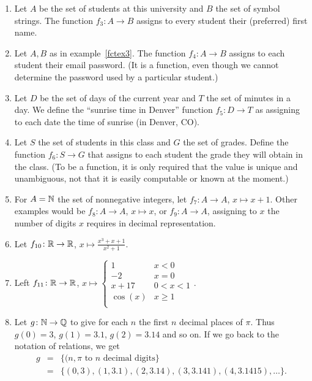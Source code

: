 \begin{enumerate}
\item Let $A$ be the set of students at this university and $B$ the set of
symbol strings. The function $f_3\colon A\to B$ assigns to every student their
(preferred) first name. \label{fctex3}
\item Let $A,B$ as in example~\ref{fctex3}.
The function $f_4\colon A\to B$ assigns to each student
their email password. (It is a function, even though we cannot determine the
password used by a particular student.)
\item Let $D$ be the set of days of the current year and $T$ the set of
minutes in a day. We define the ``sunrise time in Denver'' function $f_5\colon
D\to T$ as assigning to each date the time of sunrise (in Denver, CO).
\item Let $S$ the set of students in this class and $G$ the set of grades.
Define the function $f_6\colon S\to G$ that assigns to each student the
grade they will obtain in the class.
(To be a function, it is only required that the value is unique and
unambiguous, not that it is easily computable or known at the moment.)
\item For $A={\mathbb N}$ the set of nonnegative integers,
let $f_7\colon A\to A$, $x\mapsto x+1$. Other examples would be
$f_8\colon A\to A$, $x\mapsto x$, or
$f_9\colon A\to A$, assigning to $x$ the number of digits $x$ requires in
decimal representation.
\item Let $f_{10}\colon {\mathbb R}\to{\mathbb R}$, $x\mapsto\frac{x^3+x+1}{x^2+1}$.
\item Left $f_{11}\colon{\mathbb R}\to{\mathbb R}$, $x\mapsto\begin{cases}
1&x<0\\
-2&x=0\\
x+17&0<x<1\\
\cos(x)&x\ge 1\\
\end{cases}$.
\item Let $g\colon{\mathbb N}\to{\mathbb Q}$ to give for each $n$ the first $n$ decimal
places of $\pi$. Thus $g(0)=3$, $g(1)=3.1$, $g(2)=3.14$ and so on. If we go
back to the notation of relations, we get
\begin{eqnarray*}
g&=&\{(n,\mbox{$\pi$ to $n$ decimal digits}\}\\
&=&\{(0,3),(1,3.1),(2,3.14),(3,3.141),(4,3.1415),\ldots\}.
\end{eqnarray*}
\end{enumerate}


